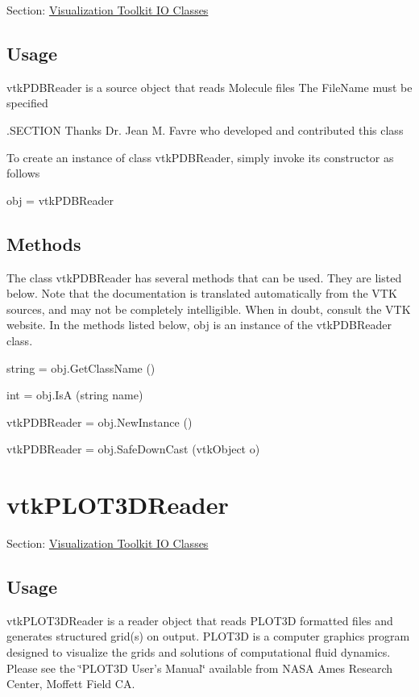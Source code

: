 Section\-: \hyperlink{sec_vtkio}{Visualization Toolkit I\-O Classes} \hypertarget{vtkwidgets_vtkxyplotwidget_Usage}{}\subsection{Usage}\label{vtkwidgets_vtkxyplotwidget_Usage}
vtk\-P\-D\-B\-Reader is a source object that reads Molecule files The File\-Name must be specified

.S\-E\-C\-T\-I\-O\-N Thanks Dr. Jean M. Favre who developed and contributed this class

To create an instance of class vtk\-P\-D\-B\-Reader, simply invoke its constructor as follows \begin{DoxyVerb}  obj = vtkPDBReader
\end{DoxyVerb}
 \hypertarget{vtkwidgets_vtkxyplotwidget_Methods}{}\subsection{Methods}\label{vtkwidgets_vtkxyplotwidget_Methods}
The class vtk\-P\-D\-B\-Reader has several methods that can be used. They are listed below. Note that the documentation is translated automatically from the V\-T\-K sources, and may not be completely intelligible. When in doubt, consult the V\-T\-K website. In the methods listed below, {\ttfamily obj} is an instance of the vtk\-P\-D\-B\-Reader class. 
\begin{DoxyItemize}
\item {\ttfamily string = obj.\-Get\-Class\-Name ()}  
\item {\ttfamily int = obj.\-Is\-A (string name)}  
\item {\ttfamily vtk\-P\-D\-B\-Reader = obj.\-New\-Instance ()}  
\item {\ttfamily vtk\-P\-D\-B\-Reader = obj.\-Safe\-Down\-Cast (vtk\-Object o)}  
\end{DoxyItemize}\hypertarget{vtkio_vtkplot3dreader}{}\section{vtk\-P\-L\-O\-T3\-D\-Reader}\label{vtkio_vtkplot3dreader}
Section\-: \hyperlink{sec_vtkio}{Visualization Toolkit I\-O Classes} \hypertarget{vtkwidgets_vtkxyplotwidget_Usage}{}\subsection{Usage}\label{vtkwidgets_vtkxyplotwidget_Usage}
vtk\-P\-L\-O\-T3\-D\-Reader is a reader object that reads P\-L\-O\-T3\-D formatted files and generates structured grid(s) on output. P\-L\-O\-T3\-D is a computer graphics program designed to visualize the grids and solutions of computational fluid dynamics. Please see the \char`\"{}\-P\-L\-O\-T3\-D User's Manual\char`\"{} available from N\-A\-S\-A Ames Research Center, Moffett Field C\-A.

